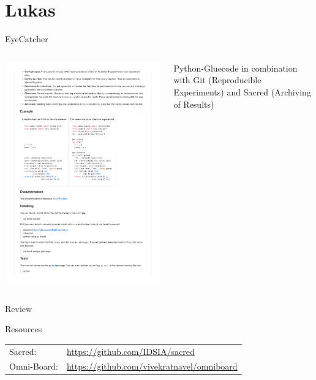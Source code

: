 \documentclass[aspectratio=169,10pt]{beamer}
\begin{document}
\section{Lukas}
\begin{frame}[fragile]{EyeCatcher}
\begin{columns}
\begin{column}{.3\textwidth}
\includegraphics[width=\textwidth]{sacred}
\end{column}
\begin{column}[t]{.7\textwidth}
Python-Gluecode in combination with Git (Reproducible Experiments) and Sacred (Archiving of Results)
\end{column}
\end{columns}

\end{frame}
\begin{frame}[t,fragile]{Review}
\end{frame}
\begin{frame}[fragile]{Resources}
\begin{tabular}{ll}
    Sacred:&\url{https://github.com/IDSIA/sacred}\\
    Omni-Board:& \url{https://github.com/vivekratnavel/omniboard}\\
\end{tabular}
\end{frame}
\end{document}
